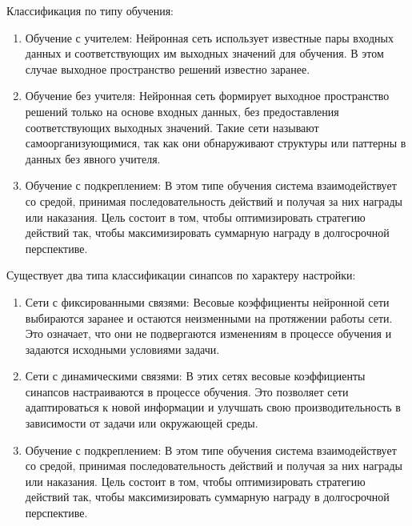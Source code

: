Классификация по типу обучения:
\begin{enumerate}
\item Обучение с учителем: Нейронная сеть использует известные пары входных данных и соответствующих им выходных значений для обучения. В этом случае выходное пространство решений известно заранее.
\item Обучение без учителя: Нейронная сеть формирует выходное пространство решений только на основе входных данных, без предоставления соответствующих выходных значений. Такие сети называют самоорганизующимися, так как они обнаруживают структуры или паттерны в данных без явного учителя.
\item Обучение с подкреплением: В этом типе обучения система взаимодействует со средой, принимая последовательность действий и получая за них награды или наказания. Цель состоит в том, чтобы оптимизировать стратегию действий так, чтобы максимизировать суммарную награду в долгосрочной перспективе.
\end{enumerate}

Существует два типа классификации синапсов по характеру настройки:
\begin{enumerate}
\item  Сети с фиксированными связями: Весовые коэффициенты нейронной сети выбираются заранее и остаются неизменными на протяжении работы сети. Это означает, что они не подвергаются изменениям в процессе обучения и задаются исходными условиями задачи.
\item Сети с динамическими связями: В этих сетях весовые коэффициенты синапсов настраиваются в процессе обучения. Это позволяет сети адаптироваться к новой информации и улучшать свою производительность в зависимости от задачи или окружающей среды.
 \item Обучение с подкреплением: В этом типе обучения система взаимодействует со средой, принимая последовательность действий и получая за них награды или наказания. Цель состоит в том, чтобы оптимизировать стратегию действий так, чтобы максимизировать суммарную награду в долгосрочной перспективе.
\end{enumerate}

